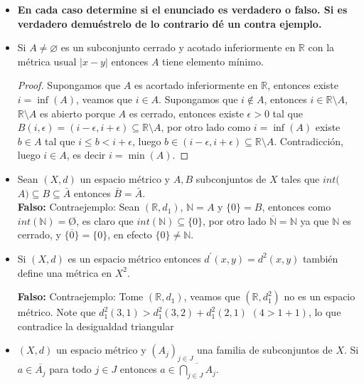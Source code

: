 \begin{itemize}[leftmargin=*]

\item[]\textbf{En cada caso determine si el enunciado es verdadero o falso. Si es verdadero demuéstrelo de lo contrario dé un contra ejemplo.}

    \item Si $A \neq \varnothing$ es un subconjunto cerrado y acotado inferiormente en $\mathbb{R}$ con la métrica usual $|x-y|$ entonces $A$ tiene elemento mínimo.\\
        
    \begin{proof}
        Supongamos que $A$ es acortado inferiormente en $\mathbb{R}$, entonces existe $i=\inf(A)$, veamos que $i\in A$. Supongamos que $i \not \in A$, entonces $i \in \mathbb{R}\setminus A$, $\mathbb{R}\setminus A$ es abierto porque $A$ es cerrado, entonces existe $\epsilon>0$ tal que $B(i,\epsilon)=(i-\epsilon,i+\epsilon)\subseteq \mathbb{R}\setminus A$, por otro lado como $i=\inf(A)$ existe $b\in A$ tal que $i\leq b< i+\epsilon$, luego $b\in (i-\epsilon,i+\epsilon)\subseteq \mathbb{R}\setminus A$. Contradicción, luego $i \in A$, es decir $i=\min(A)$.
        
    \end{proof}
    
    \item Sean $(X, d)$ un espacio métrico y $A, B$ subconjuntos de $X$ tales que $int($$A) \subseteq B \subseteq \bar{A}$ entonces $\bar{B}=\bar{A}$.\\
    
    \textbf{Falso: }Contraejemplo: Sean $(\mathbb{R},d_1)$, $\mathbb{N}=A$ y $\{0\}=B$, entonces como $int(\mathbb{N})=$\O, es claro que $int(\mathbb{N})\subseteq\{0\}$, por otro lado $\overline{\mathbb{N}}=\mathbb{N}$ ya que $\mathbb{N}$ es cerrado, y $\overline{\{0\}}=\{0\}$, en efecto $\{0\}\neq \mathbb{N}$.
    
    \item Si $(X, d)$ es un espacio métrico entonces $d^{\prime}(x, y)=d^2(x, y)$ también define una métrica en $X^2$.
    
    \textbf{Falso: }Contraejemplo: Tome $(\mathbb{R},d_1)$, veamos que $(\mathbb{R},d_1^2)$ no es un espacio métrico. Note que $d_1^2(3,1)>d_1^2(3,2)+d_1^2(2,1)$ $(4>1+1)$, lo que contradice la desigualdad triangular
    
    \item $(X, d)$ un espacio métrico y $\left(A_j\right)_{j \in J}$ una familia de subconjuntos de $X$. Si $a \in \overline{A_j}$ para todo $j \in J$ entonces $a \in \overline{\bigcap_{j \in J} A_j}$.\\
    

\end{itemize}
